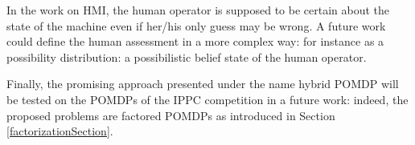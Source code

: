 In the work on HMI, 
the human operator is supposed to be certain 
about the state of the machine 
even if her/his only guess may be wrong.
A future work could define 
the human assessment in a more complex way:
for instance as a possibility distribution:
a possibilistic belief state of the human operator.


Finally, the promising approach 
presented under the name hybrid POMDP
will be tested on the POMDPs 
of the IPPC competition \cite{SannerIPPC1111} in a future work:
indeed, the proposed problems
are factored POMDPs
as introduced in Section \ref{factorizationSection}.
